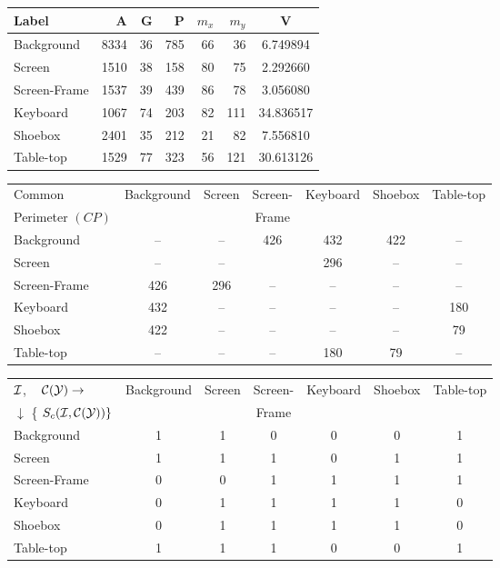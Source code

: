 {\newpage
\clearpage
\samepage \begin{table}\begin{center}
\begin{tabular}{||l||r|r|r|r|r|c||} \hline 
Label &     A       & G  & P & $m_x$ & $m_y$ & V \\  \hline \hline
Background &8334   &36  &785 &66  & 36 & 6.749894 \\  
Screen     &1510  &38  &158 &80 &75 &2.292660 \\ 
Screen-Frame      &1537  &39  &439 &86 &78 &3.056080 \\ 
Keyboard   &1067  &74  &203 &82 &111 &34.836517 \\ 
Shoebox    &2401  &35  &212 &21 &82 &7.556810   \\ 
Table-top  &1529  &77  &323 &56 &121 &30.613126 \\  
\hline 
\end{tabular}

%


\vspace{2ex}
 

\begin{tabular}{||l||c|c|c|c|c|c||} \hline
Common & Background & Screen & Screen-  & Keyboard & Shoebox &Table-top\\ 
Perimeter $(CP)$&&&Frame&&& \\  \hline \hline
Background & --& --& 426&432 & 422&--\\ 
Screen& --& --& & 296&-- &--\\ 
Screen-Frame & 426& 296& --& --&-- &--\\ 
Keyboard & 432&-- &-- & --& --& 180\\ 
Shoebox & 422& --&-- &-- & --& 79\\  
Table-top & -- & --  & --  & 180  & 79  &--\\  \hline
\end{tabular}

%



\vspace{2ex}
 

\begin{tabular}{||l||c|c|c|c|c|c||} \hline
${\cal I}$, $\;\;\;{\cal{C(Y)}}
  \rightarrow$ & Background & Screen & Screen-  & Keyboard & 
Shoebox &Table-top\\  
$\downarrow$ \{ $S_c({\cal I}
 ,{\cal{C(Y)}}
 ) \}$&&&Frame&&& \\  \hline \hline
Background & 1& 1& 0&0 & 0&1\\ 
Screen& 1& 1& 1& 0&1 &1\\ 
Screen-Frame & 0& 0& 1& 1&1 &1\\ 
Keyboard & 0&1 &1 & 1& 1& 0\\ 
Shoebox & 0& 1&1 &1 & 1& 0\\ 
Table-top &  1& 1  & 1  & 0  & 0  &1\\  \hline
\end{tabular}

%



\end{center}
 \label{tab:compi}
\end{table}
}

